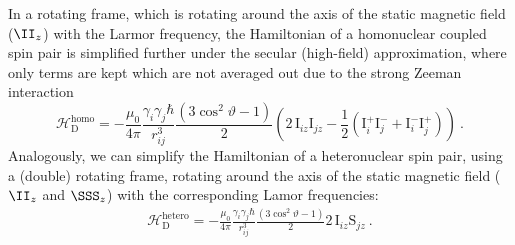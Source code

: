 In a rotating frame, which is rotating around the axis of the static magnetic field ($\II_{z}$) with the Larmor frequency, the Hamiltonian of a homonuclear coupled spin pair is simplified further under the secular (high-field) approximation, where only terms are kept which are not averaged out due to the strong Zeeman interaction
\begin{equation}
\mathcal{{H}}_{\textrm{D}}^{\textrm{homo}} = -\frac{\mu_0}{4\pi} \frac{\gamma_i\gamma_j \hbar}{r_{ij}^3}\frac{(3\cos^2\vartheta-1)}{2}   \left(2\,{\textrm{I}}_{iz} {\textrm{I}}_{jz}  - \frac{1}{2}({\textrm{I}}_i^+ {\textrm{I}}_j^- + {\textrm{I}}_i^- {\textrm{I}}_j^+)\right)~.
\label{eq:dip_coup_homo}
\end{equation}
Analogously, we can simplify the Hamiltonian of a heteronuclear spin pair, using a  (double) rotating frame, rotating around the axis of the static magnetic field ($\II_z$ and $\SSS_z$) with the corresponding Lamor frequencies:
\begin{align}
\mathcal{{H}}_{\textrm{D}}^{\textrm{hetero}} =- \frac{\mu_0}{4\pi} \frac{\gamma_i\gamma_j \hbar}{r_{ij}^3}\frac{(3\cos^2\vartheta-1)}{2}    2\,{\textrm{I}}_{iz} {\textrm{S}}_{jz}~.  
\end{align}
